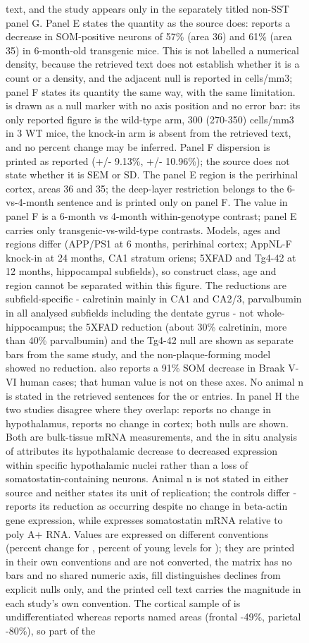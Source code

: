 \documentclass[11pt]{article}
\begin{document}
\begin{figure}[H]
text, and the study appears only in the separately titled non-SST panel G. Panel E states the quantity as the source does: \citet{SanchezMejias2019} reports a decrease in SOM-positive neurons of 57\% (area 36) and 61\% (area 35) in 6-month-old transgenic mice. This is not labelled a numerical density, because the retrieved text does not establish whether it is a count or a density, and the adjacent null is reported in cells/mm3; panel F states its quantity the same way, with the same limitation. \citet{Sos2020} is drawn as a null marker with no axis position and no error bar: its only reported figure is the wild-type arm, 300 (270-350) cells/mm3 in 3 WT mice, the knock-in arm is absent from the retrieved text, and no percent change may be inferred. Panel F dispersion is printed as reported (+/- 9.13\%, +/- 10.96\%); the source does not state whether it is SEM or SD. The panel E region is the perirhinal cortex, areas 36 and 35; the deep-layer restriction belongs to the 6-vs-4-month sentence and is printed only on panel F. The \citet{SanchezMejias2019} value in panel F is a 6-month vs 4-month within-genotype contrast; panel E carries only transgenic-vs-wild-type contrasts. Models, ages and regions differ (APP/PS1 at 6 months, perirhinal cortex; AppNL-F knock-in at 24 months, CA1 stratum oriens; 5XFAD and Tg4-42 at 12 months, hippocampal subfields), so construct class, age and region cannot be separated within this figure. The \citet{Giesers2020} reductions are subfield-specific - calretinin mainly in CA1 and CA2/3, parvalbumin in all analysed subfields including the dentate gyrus - not whole-hippocampus; the 5XFAD reduction (about 30\% calretinin, more than 40\% parvalbumin) and the Tg4-42 null are shown as separate bars from the same study, and the non-plaque-forming model showed no reduction. \citet{SanchezMejias2019} also reports a 91\% SOM decrease in Braak V-VI human cases; that human value is not on these axes. No animal n is stated in the retrieved sentences for the \citet{SanchezMejias2019} or \citet{Giesers2020} entries. In panel H the two studies disagree where they overlap: \citet{Florio1991} reports no change in hypothalamus, \citet{SONNTAG1990} reports no change in cortex; both nulls are shown. Both are bulk-tissue mRNA measurements, and the in situ analysis of \citet{SONNTAG1990} attributes its hypothalamic decrease to decreased expression within specific hypothalamic nuclei rather than a loss of somatostatin-containing neurons. Animal n is not stated in either source and neither states its unit of replication; the controls differ - \citet{Florio1991} reports its reduction as occurring despite no change in beta-actin gene expression, while \citet{SONNTAG1990} expresses somatostatin mRNA relative to poly A+ RNA. Values are expressed on different conventions (percent change for \citet{Florio1991}, percent of young levels for \citet{SONNTAG1990}); they are printed in their own conventions and are not converted, the matrix has no bars and no shared numeric axis, fill distinguishes declines from explicit nulls only, and the printed cell text carries the magnitude in each study's own convention. The cortical sample of \citet{SONNTAG1990} is undifferentiated whereas \citet{Florio1991} reports named areas (frontal -49\%, parietal -80\%), so part of the 
\end{figure}
\end{document}

